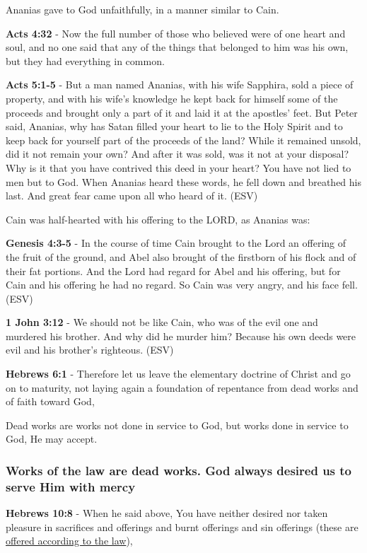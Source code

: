 \documentclass[11pt]{article}
\begin{document}
Ananias gave to God unfaithfully, in a manner similar to Cain.

\textbf{Acts 4:32} - Now the full number of those who believed were of one heart and soul, and no one said that any of the things that belonged to him was his own, but they had everything in common.

\textbf{Acts 5:1-5} -  But a man named Ananias, with his wife Sapphira, sold a piece of property, and with his wife's knowledge he kept back for himself some of the proceeds and brought only a part of it and laid it at the apostles' feet.  But Peter said, Ananias, why has Satan filled your heart to lie to the Holy Spirit and to keep back for yourself part of the proceeds of the land?  While it remained unsold, did it not remain your own?  And after it was sold, was it not at your disposal?  Why is it that you have contrived this deed in your heart?  You have not lied to men but to God.  When Ananias heard these words, he fell down and breathed his last.  And great fear came upon all who heard of it.  (ESV)

Cain was half-hearted with his offering to the LORD, as Ananias was:

\textbf{Genesis 4:3-5} - In the course of time Cain brought to the Lord an offering of the fruit of the ground, and Abel also brought of the firstborn of his flock and of their fat portions. And the Lord had regard for Abel and his offering, but for Cain and his offering he had no regard. So Cain was very angry, and his face fell. (ESV)

\textbf{1 John 3:12} - We should not be like Cain, who was of the evil one and murdered his brother. And why did he murder him? Because his own deeds were evil and his brother's righteous. (ESV)

\textbf{Hebrews 6:1} - Therefore let us leave the elementary doctrine of Christ and go on to maturity, not laying again a foundation of repentance from dead works and of faith toward God,

Dead works are works not done in service to God, but works done in service to God, He may accept.

\subsubsection{Works of the law are dead works. God always desired us to serve Him with mercy}
\label{sec:orgb5f48c9}
\textbf{Hebrews 10:8} - When he said above, You have neither desired nor taken pleasure in sacrifices and offerings and burnt offerings and sin offerings (these are \uline{offered according to the law}),
\end{document}
